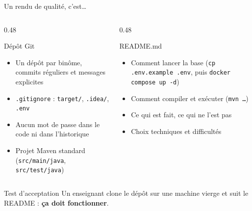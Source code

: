 \documentclass[aspectratio=169,10pt]{beamer}
\begin{document}
\begin{frame}{Un rendu de qualit\'e, c'est\ldots}
  \begin{columns}[T]
    \begin{column}{0.48\textwidth}
      \begin{block}{D\'ep\^ot Git}
        \begin{itemize}
          \item Un d\'ep\^ot par bin\^ome, commits r\'eguliers et messages explicites
          \item \texttt{.gitignore} : \texttt{target/}, \texttt{.idea/}, \alert{\texttt{.env}}
          \item Aucun mot de passe dans le code ni dans l'historique
          \item Projet Maven standard (\texttt{src/main/java}, \texttt{src/test/java})
        \end{itemize}
      \end{block}
    \end{column}
    \begin{column}{0.48\textwidth}
      \begin{block}{README.md}
        \begin{itemize}
          \item Comment lancer la base (\texttt{cp .env.example .env}, puis \texttt{docker compose up -d})
          \item Comment compiler et ex\'ecuter (\texttt{mvn \ldots})
          \item Ce qui est fait, ce qui ne l'est pas
          \item Choix techniques et difficult\'es
        \end{itemize}
      \end{block}
    \end{column}
  \end{columns}
  \vspace{2mm}
  \begin{alertblock}{Test d'acceptation}
    Un enseignant clone le d\'ep\^ot sur une machine vierge et suit le README : \textbf{\c{c}a doit fonctionner}.
  \end{alertblock}
\end{frame}
\end{document}

